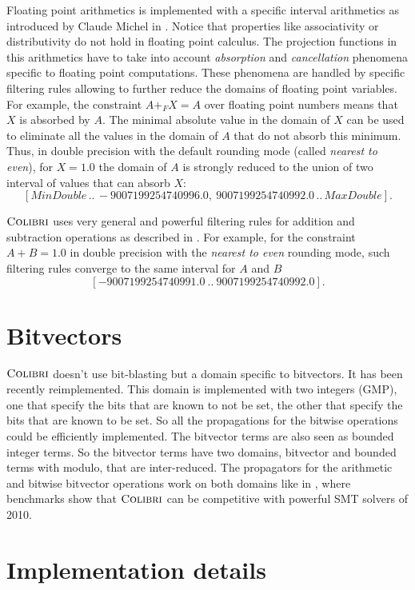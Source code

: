 \documentclass[a4paper]{article}
\newcommand{\COLIBRI}{\ensuremath{\mbox{\scshape Colibri}}\xspace}
\begin{document}
Floating point arithmetics is implemented with a specific interval arithmetics as
introduced by Claude Michel in \cite{Michel02}. Notice that properties like
associativity or distributivity do not hold in floating point calculus.
The projection functions in this arithmetics have to take into account
{\em absorption} and {\em cancellation} phenomena specific to floating point
computations. These phenomena are handled by specific filtering rules allowing to
further reduce  the domains of floating point variables. For example,
the constraint $A +_F X = A$ over floating point numbers
means that $X$ is absorbed by $A$.
The minimal absolute value in the domain of $X$ can be used to eliminate all the
values in the domain of $A$ that do not absorb this minimum. Thus, in double
precision with the default rounding mode (called {\em nearest to even}), for
$X = 1.0$ the domain of $A$ is strongly reduced to the union of two interval
of values that can absorb $X$:
$$[\mathit{MinDouble}\, ..\, -9007199254740996.0, \ 9007199254740992.0\, ..\, \mathit{MaxDouble}].$$

\COLIBRI{} uses very general and powerful filtering rules for addition
and subtraction operations as described in \cite{MarreM10}. For example, for the
constraint $A+B=1.0$ in double precision with the {\em nearest to even} rounding mode,
such filtering rules converge to the same interval for $A$ and $B$
$$[-9007199254740991.0\ ..\ 9007199254740992.0].$$

\section{Bitvectors}

\COLIBRI{} doesn't use bit-blasting but a domain specific to
bitvectors\cite{Michel2012}. It has been recently reimplemented. This
domain is implemented with two integers (GMP), one that specify the
bits that are known to not be set, the other that specify the bits
that are known to be set. So all the propagations for the bitwise
operations could be efficiently implemented. The bitvector terms are
also seen as bounded integer terms. So the bitvector terms have two
domains, bitvector and bounded terms with modulo, that are
inter-reduced. The propagators for the arithmetic and bitwise
bitvector operations work on both domains like in \cite{BardinHP10},
where benchmarks show that \COLIBRI{} can be competitive with powerful
SMT solvers of 2010.

\section{Implementation details}\label{SubsecColibriImplementation}
\end{document}
